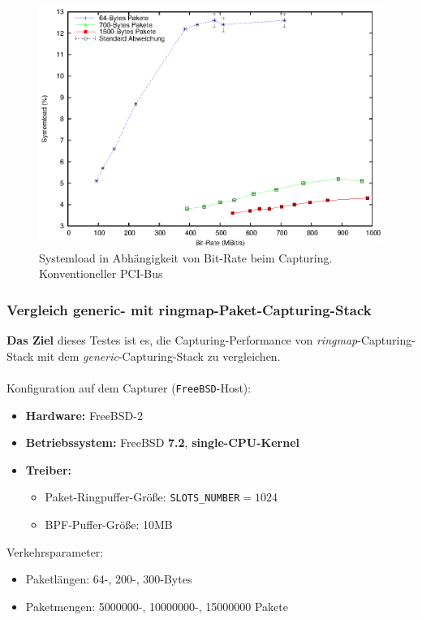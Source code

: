 \begin{figure} 
\centering \includegraphics[width=5.5in]{plots/graphs/sysload_PCI_mbs.eps}
\caption{Systemload in Abhängigkeit von Bit-Rate beim Capturing. Konventioneller PCI-Bus}
\label{img:plot_sysload_pci_mbs}
\end{figure}

\subsubsection{Vergleich generic- mit ringmap-Paket-Capturing-Stack}\label{sec:erg_verg}
\textbf{Das Ziel} dieses Testes ist es, die Capturing-Performance von 
\emph{ringmap}-Capturing-Stack mit dem \emph{generic}-Capturing-Stack
zu vergleichen.\\\\
%
Konfiguration auf dem Capturer (\verb+FreeBSD+-Host): 
\begin{itemize}
	\item \textbf{Hardware:} FreeBSD-2 
	\item \textbf{Betriebssystem:} FreeBSD \textbf{7.2}, \textbf{single-CPU-Kernel}
	\item \textbf{Treiber:} 
		\begin{itemize}
			\item Paket-Ringpuffer-Größe: \verb+SLOTS_NUMBER+$=1024$
			\item BPF-Puffer-Größe: 10MB
		\end{itemize}
\end{itemize}
Verkehrsparameter:
\begin{itemize}
	\item Paketlängen: 64-, 200-, 300-Bytes
	\item Paketmengen: 5000000-, 10000000-, 15000000 Pakete 
\end{itemize}

